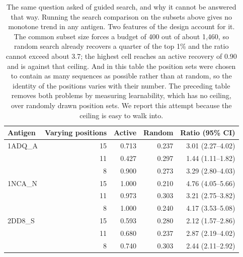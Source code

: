 \documentclass[11pt,a4paper]{article}
\begin{document}
\begin{table}[h]
\caption{The same question asked of guided search, and why it cannot be answered that way. Running the search comparison on the subsets above gives no monotone trend in any antigen. Two features of the design account for it. The common subset size forces a budget of 400 out of about 1,460, so random search already recovers a quarter of the top 1\% and the ratio cannot exceed about 3.7; the highest cell reaches an active recovery of 0.90 and is against that ceiling. And in this table the position sets were chosen to contain as many sequences as possible rather than at random, so the identity of the positions varies with their number. The preceding table removes both problems by measuring learnability, which has no ceiling, over randomly drawn position sets. We report this attempt because the ceiling is easy to walk into.}
\centering
\begin{tabular}{@{}lrrrr@{}}
\toprule
Antigen & Varying positions & Active & Random & Ratio (95\% CI) \\
\midrule
1ADQ\_A & 15 & 0.713 & 0.237 & 3.01 (2.27--4.02) \\
 & 11 & 0.427 & 0.297 & 1.44 (1.11--1.82) \\
 & 8 & 0.900 & 0.273 & 3.29 (2.80--4.03) \\
\midrule
1NCA\_N & 15 & 1.000 & 0.210 & 4.76 (4.05--5.66) \\
 & 11 & 0.973 & 0.303 & 3.21 (2.75--3.82) \\
 & 8 & 1.000 & 0.240 & 4.17 (3.53--5.08) \\
\midrule
2DD8\_S & 15 & 0.593 & 0.280 & 2.12 (1.57--2.86) \\
 & 11 & 0.680 & 0.237 & 2.87 (2.19--4.02) \\
 & 8 & 0.740 & 0.303 & 2.44 (2.11--2.92) \\
\bottomrule
\end{tabular}
\end{table}
\end{document}
